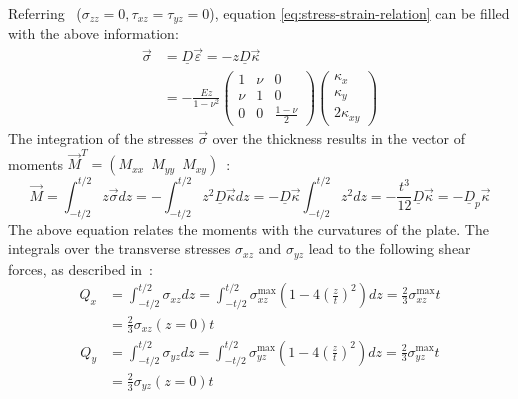   Referring~\cite{klein2013fem} ($\sigma_{zz} = 0, \tau_{xz} = \tau_{yz} = 0$), equation \eqref{eq:stress-strain-relation} can be filled with the above information:
  \begin{align}\label{eq:sigma=-z*D*kappa}
  \vec{\sigma} &= \underline{D} \vec{\varepsilon} = -z \underline{D} \vec{\kappa} \nonumber\\
               &= -\frac{E z}{1-\nu^2} \begin{pmatrix}
               1&\nu&0\\
               \nu&1&0\\
               0&0&\frac{1-\nu}{2}
               \end{pmatrix} \begin{pmatrix}
               \kappa_x\\\kappa_y\\2\kappa_{xy}
               \end{pmatrix}
  \end{align}
  The integration of the stresses $\vec{\sigma}$ over the thickness results in the vector of moments $\vec{M}^T = \left(M_{xx}\ \;M_{yy}\ \;M_{xy}\right)$~\cite{steinke2005finite}:
  \begin{equation}\label{eq:M=-Dp*kappa}
  \vec{M} = \int_{-t/2}^{t/2} z\vec{\sigma} dz = -\int_{-t/2}^{t/2} z^2 \underline{D} \vec{\kappa} dz = -\underline{D} \vec{\kappa} \int_{-t/2}^{t/2} z^2 dz = -\frac{t^3}{12} \underline{D} \vec{\kappa} = -\underline{D}_p \vec{\kappa}
  \end{equation}
  The above equation relates the moments with the curvatures of the plate. The integrals over the transverse stresses $\sigma_{xz}$ and $\sigma_{yz}$ lead to the following shear forces, as described in~\cite{steinke2005finite}:
  \begin{align}
  Q_x &= \int_{-t/2}^{t/2}\sigma_{xz} dz = \int_{-t/2}^{t/2} \sigma_{xz}^{\max} \left(1-4\left(\frac{z}{t}\right)^2\right)dz = \frac{2}{3} \sigma_{xz}^{\max} t \nonumber\\
  &= \frac{2}{3} \sigma_{xz}(z=0) t
  \end{align}
  \begin{align}
  Q_y &= \int_{-t/2}^{t/2}\sigma_{yz} dz = \int_{-t/2}^{t/2} \sigma_{yz}^{\max} \left(1-4\left(\frac{z}{t}\right)^2\right)dz = \frac{2}{3} \sigma_{yz}^{\max} t \nonumber\\
  &= \frac{2}{3} \sigma_{yz}(z=0) t
  \end{align}
